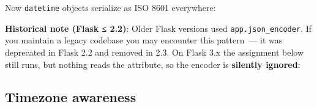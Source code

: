 \noindent{}Now \texttt{datetime} objects serialize as ISO 8601 everywhere:

\begin{codebox}[short]

\begin{Shaded}
\begin{Highlighting}[]
\NormalTok{: row[}\NormalTok{]\}), }
\end{Highlighting}
\end{Shaded}

\end{codebox}

\noindent{}\textbf{Historical note (Flask ≤ 2.2)}: Older Flask versions used \texttt{app.json\_encoder}. If you maintain a legacy codebase you may encounter this pattern~--- it was deprecated in Flask 2.2 and removed in 2.3. On Flask 3.x the assignment below still runs, but nothing reads the attribute, so the encoder is \textbf{silently ignored}:

\begin{codebox}[short]

\begin{Shaded}
\begin{Highlighting}[]

         
         

\OperatorTok{=}
\end{Highlighting}
\end{Shaded}

\end{codebox}

\subsection*{Timezone awareness}\label{34-response-handling:timezone-awareness}

